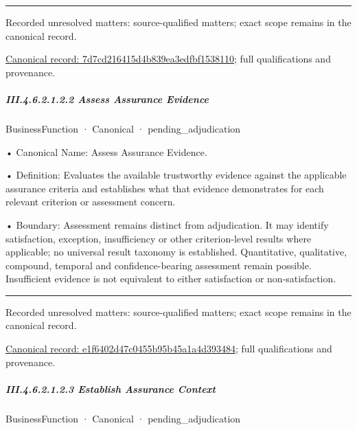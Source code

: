 \medskip\hrule\medskip

{\small Recorded unresolved matters: source-qualified matters; exact scope remains in the canonical record.}\par
{\footnotesize \href{../../../../continuum/business/business-function/7d7cd216415d4b839ea3edfbf1538110.md}{Canonical record: 7d7cd216415d4b839ea3edfbf1538110}; full qualifications and provenance.}\par
\subparagraph*{III.4.6.2.1.2.2 Assess Assurance Evidence}
\label{navigation:III.4.6.2.1.2.2}

\label{element:e1f6402d47c0455b95b45a1a4d393484}
{\small BusinessFunction · Canonical · pending\_adjudication}\par

•
Canonical Name: Assess Assurance Evidence.



•
Definition: Evaluates the available trustworthy evidence against the applicable assurance criteria and establishes what that evidence demonstrates for each relevant criterion or assessment concern.



•
Boundary: Assessment remains distinct from adjudication. It may identify satisfaction, exception, insufficiency or other criterion-level results where applicable; no universal result taxonomy is established. Quantitative, qualitative, compound, temporal and confidence-bearing assessment remain possible. Insufficient evidence is not equivalent to either satisfaction or non-satisfaction.



\medskip\hrule\medskip

{\small Recorded unresolved matters: source-qualified matters; exact scope remains in the canonical record.}\par
{\footnotesize \href{../../../../continuum/business/business-function/e1f6402d47c0455b95b45a1a4d393484.md}{Canonical record: e1f6402d47c0455b95b45a1a4d393484}; full qualifications and provenance.}\par
\subparagraph*{III.4.6.2.1.2.3 Establish Assurance Context}
\label{navigation:III.4.6.2.1.2.3}

\label{element:ffffe352e28c4e878d986b0e15ddff15}
{\small BusinessFunction · Canonical · pending\_adjudication}\par

